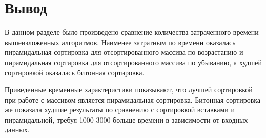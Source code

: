 \clearpage

\section{Вывод}
В данном разделе было произведено сравнение количества затраченного времени вышеизложенных алгоритмов.
Наименее затратным по времени оказалась пирамидальная сортировка для отсортированного массива по возрастанию и пирамидальная сортировка для отсортированного массива по убыванию, а худшей сортировкой оказалась битонная сортировка.

Приведенные временные характеристики показывают, что лучшей сортировкой при работе с массивом является пирамидальная сортировка.
Битонная сортировка же показала худшие результаты по сравнению с сортировкой вставками и пирамидальной, требуя 1000-3000 больше времени в зависимости от входных данных.
